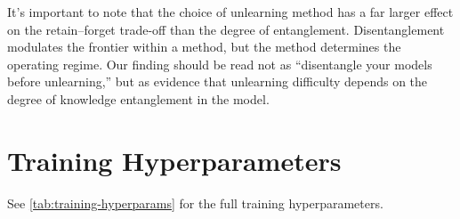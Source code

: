 \documentclass{article} %
\begin{document}
It's important to note that the choice of unlearning method has a far larger effect on the retain--forget trade-off than the degree of entanglement. Disentanglement modulates the frontier within a method, but the method determines the operating regime. Our finding should be read not as ``disentangle your models before unlearning,'' but as evidence that unlearning difficulty depends on the degree of knowledge entanglement in the model.





\appendix

\section{Training Hyperparameters} \label{app:hyperparams}

See \cref{tab:training-hyperparams} for the full training hyperparameters.
\end{document}
